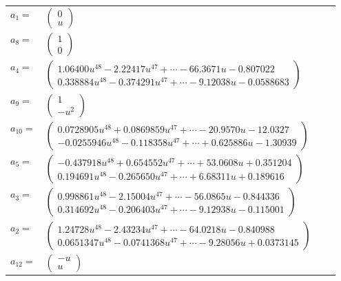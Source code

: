 \documentclass[1p]{elsarticle_modified}
\theoremstyle{definition}
\begin{document}
\begin{tabular}{m{7pt} m{180pt} m{7pt} m{180pt} }
\flushright $a_{1}=$&$\begin{pmatrix}0\\u\end{pmatrix}$ \\
\flushright $a_{8}=$&$\begin{pmatrix}1\\0\end{pmatrix}$ \\
\flushright $a_{4}=$&$\begin{pmatrix}1.06400 u^{48}-2.22417 u^{47}+\cdots-66.3671 u-0.807022\\0.338884 u^{48}-0.374291 u^{47}+\cdots-9.12038 u-0.0588683\end{pmatrix}$ \\
\flushright $a_{9}=$&$\begin{pmatrix}1\\- u^2\end{pmatrix}$ \\
\flushright $a_{10}=$&$\begin{pmatrix}0.0728905 u^{48}+0.0869859 u^{47}+\cdots-20.9570 u-12.0327\\-0.0255946 u^{48}-0.118358 u^{47}+\cdots+0.625886 u-1.30939\end{pmatrix}$ \\
\flushright $a_{5}=$&$\begin{pmatrix}-0.437918 u^{48}+0.654552 u^{47}+\cdots+53.0608 u+0.351204\\0.194691 u^{48}-0.265650 u^{47}+\cdots+6.68311 u+0.189616\end{pmatrix}$ \\
\flushright $a_{3}=$&$\begin{pmatrix}0.998861 u^{48}-2.15004 u^{47}+\cdots-56.0865 u-0.844336\\0.314692 u^{48}-0.206403 u^{47}+\cdots-9.12938 u-0.115001\end{pmatrix}$ \\
\flushright $a_{2}=$&$\begin{pmatrix}1.24728 u^{48}-2.43234 u^{47}+\cdots-64.0218 u-0.840988\\0.0651347 u^{48}-0.0741368 u^{47}+\cdots-9.28056 u+0.0373145\end{pmatrix}$ \\
\flushright $a_{12}=$&$\begin{pmatrix}- u\\u\end{pmatrix}$ \\

\end{tabular}
\end{document}
